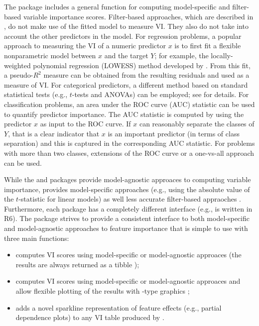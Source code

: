 The  package \citep{caret-pkg} includes a general  function for computing model-specific and filter-based variable importance scores. Filter-based approaches, which are described in \citet{applied-kuhn-2013}, do not make use of the fitted model to measure VI. They also do not take into account the other predictors in the model. For regression problems, a popular approach to measuring the VI of a numeric predictor $x$ is to first fit a flexible nonparametric model between $x$ and the target $Y$; for example, the locally-weighted polynomial regression (LOWESS) method developed by \citet{robust-cleveland-1979}. From this fit, a pseudo-$R^2$ measure can be obtained from the resulting residuals and used as a measure of VI. For categorical predictors, a different method based on standard statistical tests (e.g., $t$-tests and ANOVAs) can be employed; see
\citet{applied-kuhn-2013} for details. For classification problems, an area under the ROC curve (AUC) statistic can be used to quantify predictor importance. The AUC statistic is computed by using the predictor $x$ as input to the ROC curve. If $x$ can reasonably separate the classes of $Y$, that is a clear indicator that $x$ is an important predictor (in terms of class separation) and this is captured in the corresponding AUC statistic. For problems with more than two classes, extensions of the ROC curve or a one-vs-all approach can be used.

While the  and  packages provide model-agnostic approaces to computing variable importance,  provides model-specific approaches (e.g., using the absolute value of the $t$-statistic for linear models) as well less accurate filter-based appraoches . Furthermore, each package has a completely different interface (e.g.,  is written in R6). The  package \citep{vip-pkg} strives to provide a consistent interface to both model-specific and model-agnostic approaches to feature importance that is simple to use with three main functions:

\begin{itemize}
 
  \item {} computes VI scores using model-specific or model-agnostic approaces (the results are always returned as a tibble \citep{tibble-pkg});
  
  \item {} computes VI scores using model-specific or model-agnostic approaces and allow flexible plotting of the results with -type graphics \citep{ggplot2-pkg};
  
  \item {} adds a novel sparkline representation of feature effects (e.g., partial dependence plots) to any VI table produced by .

\end{itemize}

